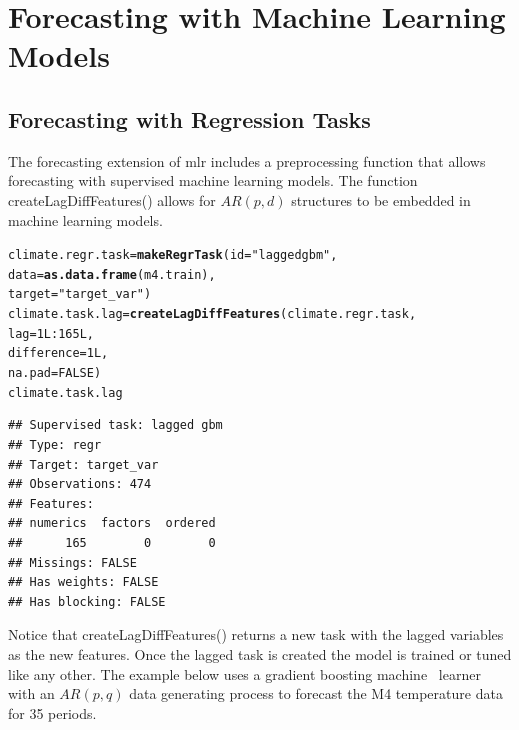\documentclass[12pt]{article}\usepackage[]{graphicx}\usepackage[]{color}
\makeatletter
\newcommand{\hlnum}[1]{\textcolor[rgb]{0.686,0.059,0.569}{#1}}%
\newcommand{\hlstr}[1]{\textcolor[rgb]{0.192,0.494,0.8}{#1}}%
\newcommand{\hlopt}[1]{\textcolor[rgb]{0,0,0}{#1}}%
\newcommand{\hlstd}[1]{\textcolor[rgb]{0.345,0.345,0.345}{#1}}%
\newcommand{\hlkwb}[1]{\textcolor[rgb]{0.69,0.353,0.396}{#1}}%
\newcommand{\hlkwc}[1]{\textcolor[rgb]{0.333,0.667,0.333}{#1}}%
\newcommand{\hlkwd}[1]{\textcolor[rgb]{0.737,0.353,0.396}{\textbf{#1}}}%
\newenvironment{kframe}{%
 \def\at@end@of@kframe{}%
 \ifinner\ifhmode%
  \def\at@end@of@kframe{\end{minipage}}%
  \begin{minipage}{\columnwidth}%
 \fi\fi%
 \def\FrameCommand##1{\hskip\@totalleftmargin \hskip-\fboxsep
 \colorbox{shadecolor}{##1}\hskip-\fboxsep
     \hskip-\linewidth \hskip-\@totalleftmargin \hskip\columnwidth}%
 \MakeFramed {\advance\hsize-\width
   \@totalleftmargin\z@ \linewidth\hsize
   \@setminipage}}%
 {\par\unskip\endMakeFramed%
 \at@end@of@kframe}
\newenvironment{knitrout}{}{} %
\theoremstyle{definition}
\newcommand\code{\@codex}
\def\@codex#1{{\normalfont\ttfamily\hyphenchar\font=-1 #1}}
\newcommand{\pkg}[1]{{\fontseries{b}\selectfont #1}}
\makeatother
\begin{document}
\section{Forecasting with Machine Learning Models}
\label{sec:preproc}
\subsection{Forecasting with Regression Tasks}
\label{sec:preprocAR}
\doublespacing
The forecasting extension of \pkg{mlr} includes a preprocessing function that allows forecasting with supervised machine learning models. The function \code{createLagDiffFeatures()} allows for $AR(p,d)$ structures to be embedded in machine learning models.
\singlespacing
\begin{knitrout}
\color{fgcolor}\begin{kframe}
\begin{alltt}
\hlstd{climate.regr.task} \hlkwb{=} \hlkwd{makeRegrTask}\hlstd{(}\hlkwc{id} \hlstd{=} \hlstr{"lagged gbm"}\hlstd{,}
                                 \hlkwc{data} \hlstd{=} \hlkwd{as.data.frame}\hlstd{(m4.train),}
                                 \hlkwc{target} \hlstd{=} \hlstr{"target_var"}\hlstd{)}
\hlstd{climate.task.lag} \hlkwb{=} \hlkwd{createLagDiffFeatures}\hlstd{(climate.regr.task,}
                                         \hlkwc{lag} \hlstd{=} \hlnum{1L}\hlopt{:}\hlnum{165L}\hlstd{,}
                                         \hlkwc{difference} \hlstd{=} \hlnum{1L}\hlstd{,}
                                         \hlkwc{na.pad}\hlstd{=}\hlnum{FALSE}\hlstd{)}
\hlstd{climate.task.lag}
\end{alltt}
\begin{verbatim}
## Supervised task: lagged gbm
## Type: regr
## Target: target_var
## Observations: 474
## Features:
## numerics  factors  ordered 
##      165        0        0 
## Missings: FALSE
## Has weights: FALSE
## Has blocking: FALSE
\end{verbatim}
\end{kframe}
\end{knitrout}
\doublespacing

Notice that \code{createLagDiffFeatures()} returns a new task with the lagged variables as the new features. Once the lagged task is created the model is trained or tuned like any other. The example below uses a gradient boosting machine~\cite{gbm} learner with an $AR(p,q)$ data generating process to forecast the M4 temperature data for 35 periods.
\end{document}
